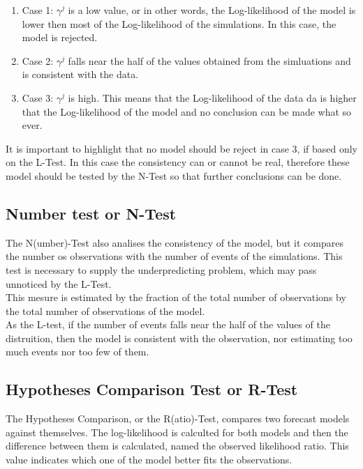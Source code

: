 \begin{enumerate}
\item Case 1: $\gamma^{j}$ is a low value, or in other words, the
  Log-likelihood of the model is lower then most of the Log-likelihood
  of the simulations. In this case, the model is rejected.
\item Case 2: $\gamma^{j}$ falls near the half of the values obtained
  from the simluations and is consistent with the data.
\item Case 3: $\gamma^{j}$ is high. This means that the Log-likelihood
  of the data da is higher that the Log-likelihood of the model and no
  conclusion can be made what so ever.
\end{enumerate}


It is important to highlight that no model should be reject in case 3,
if based only on the L-Test. In this case the consistency can or
cannot be real, therefore these model should be tested by the N-Test
so that further conclusions can be done.\\

\subsection{Number test or N-Test}
The N(umber)-Test also analises the consistency of the model, but it
compares the number os observations with the number of events of the
simulations. This test is necessary to supply the underpredicting
problem, which may pass unnoticed by the L-Test.\\

This mesure is estimated by the fraction of the total number of
observations by the total number of observations of the model.\\

As the L-test, if the number of events falls near the half of the
values of the distruition, then the model is consistent with the
observation, nor estimating too much events nor too few of them.\\

\subsection{Hypotheses Comparison Test or R-Test}

The Hypotheses Comparison, or the R(atio)-Test, compares two forecast
models against themselves. The log-likelihood is calculted for both
models and then the difference between them is calculated, named the
observed likelihood ratio. This value indicates which one of the model
better fits the observations.\\

